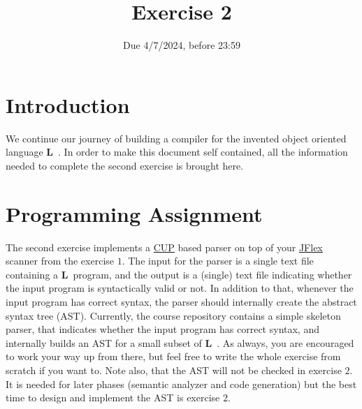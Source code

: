 \documentclass{article}
\begin{document}
\title{Exercise 2}


\date{Due 4/7/2024, before 23:59}

\maketitle

\newcommand{\plname}{\textbf{L}\ }

\section{Introduction}
We continue our journey of building a compiler
for the invented object oriented language \plname.
In order to make this document self contained,
all the information needed to complete the second exercise is brought here.
\section{Programming Assignment}
The second exercise implements a \href{http://www2.cs.tum.edu/projects/cup/}{CUP} based
parser on top of your \href{http://jflex.de/}{JFlex} scanner from the exercise $1$.
The input for the parser is a single text file containing a \plname program,
and the output is a (single) text file indicating whether the input program
is syntactically valid or not. In addition to that,
whenever the input program has correct syntax,
the parser should internally create the abstract syntax tree (AST).
Currently, the course repository contains a simple skeleton
parser, that indicates whether the input program has correct syntax,
and internally builds an AST for a small subset of \plname.
As always, you are encouraged to work your way up from there,
but feel free to write the whole exercise from scratch if you want to.
Note also, that the AST will not be checked in exercise $2$.
It is needed for later phases (semantic analyzer and code generation)
but the best time to design and implement the AST is exercise $2$.
\end{document}
